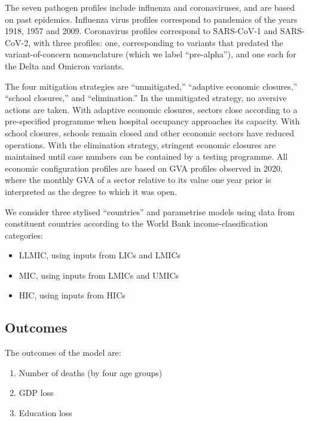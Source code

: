 \documentclass[
]{article}
\providecommand{\tightlist}{%
  \setlength{\itemsep}{0pt}\setlength{\parskip}{0pt}}
\begin{document}
The seven pathogen profiles include influenza and coronaviruses, and are based on past epidemics. Influenza virus profiles correspond to pandemics of the years 1918, 1957 and 2009. Coronavirus profiles correspond to SARS-CoV-1 and SARS-CoV-2, with three profiles: one, corresponding to variants that predated the variant-of-concern nomenclature (which we label ``pre-alpha''), and one each for the Delta and Omicron variants.

The four mitigation strategies are ``unmitigated,'' ``adaptive economic closures,'' ``school closures,'' and ``elimination.'' In the unmitigated strategy, no aversive actions are taken. With adaptive economic closures, sectors close according to a pre-specified programme when hospital occupancy approaches its capacity. With school closures, schools remain closed and other economic sectors have reduced operations. With the elimination strategy, stringent economic closures are maintained until case numbers can be contained by a testing programme. All economic configuration profiles are based on GVA profiles observed in 2020, where the monthly GVA of a sector relative to its value one year prior is interpreted as the degree to which it was open.

We consider three stylised ``countries'' and parametrise models using data from constituent countries according to the World Bank income-classification categories:

\begin{itemize}
\tightlist
\item
  LLMIC, using inputs from LICs and LMICs
\item
  MIC, using inputs from LMICs and UMICs
\item
  HIC, using inputs from HICs
\end{itemize}

\hypertarget{outcomes}{%
\subsection{Outcomes}\label{outcomes}}

The outcomes of the model are:

\begin{enumerate}
\def\labelenumi{\arabic{enumi}.}
\tightlist
\item
  Number of deaths (by four age groups)
\item
  GDP loss
\item
  Education loss
\end{enumerate}
\end{document}
